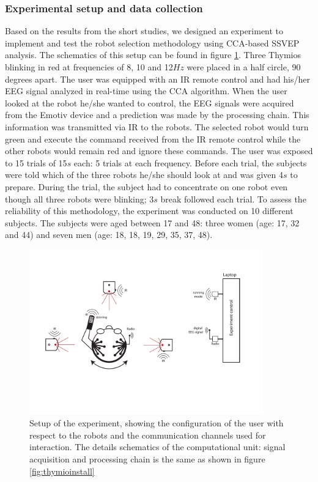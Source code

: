 \documentclass[smallextended]{svjour3}
\begin{document}
\subsubsection{Experimental setup and data collection}
Based on the results from the short studies, we designed an experiment to implement and test the robot selection methodology using CCA-based SSVEP analysis. The schematics of this setup can be found in figure \ref{fig:experiment-set-up}. Three Thymios blinking in red at frequencies of 8, 10 and 12$Hz$ were placed in a half circle, 90 degrees apart. The user was equipped with an IR remote control and had his/her EEG signal analyzed in real-time using the CCA algorithm. When the user looked at the robot he/she wanted to control, the EEG signals were acquired from the Emotiv device and a prediction was made by the processing chain. This information was transmitted via IR to the robots. The selected robot would turn green and execute the command received from the IR remote control while the other robots would remain red and ignore these commands. The user was exposed to 15 trials of 15$s$ each: 5 trials at each frequency. Before each trial, the subjects were told which of the three robots he/she should look at and was given 4$s$ to prepare. During the trial, the subject had to concentrate on one robot even though all three robots were blinking; 3$s$ break followed each trial. To assess the reliability of this methodology, the experiment was conducted on 10 different subjects. The subjects were aged between 17 and 48: three women (age: 17, 32 and 44) and seven men (age: 18, 18, 19, 29, 35, 37, 48). 

\begin{figure}
\center
\includegraphics[width=0.9\textwidth]{figures/schema-global2.pdf}
\caption{Setup of the experiment, showing the configuration of the user with respect to the robots and the communication channels used for interaction. The details schematics of the computational unit: signal acquisition and processing chain is the same as shown in figure \ref{fig:thymioinstall}} \label{fig:experiment-set-up}
\end{figure}
\end{document}
